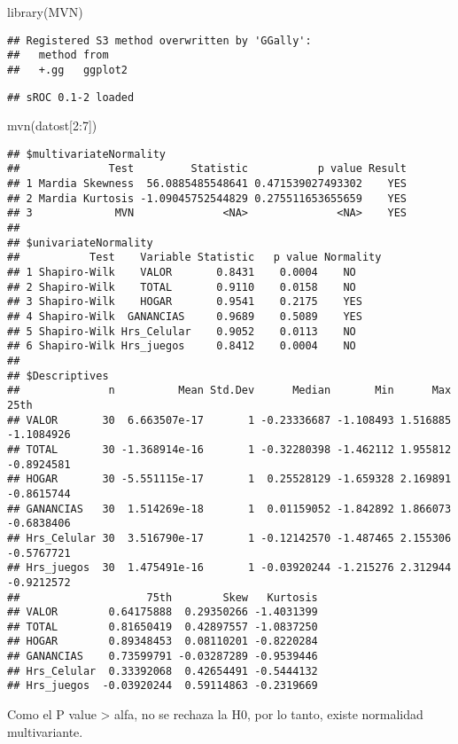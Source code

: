 \documentclass[
]{article}
\newenvironment{Shaded}{\begin{snugshade}}{\end{snugshade}}
\newcommand{\DecValTok}[1]{\textcolor[rgb]{0.00,0.00,0.81}{#1}}
\newcommand{\FunctionTok}[1]{\textcolor[rgb]{0.00,0.00,0.00}{#1}}
\newcommand{\NormalTok}[1]{#1}
\newcommand{\SpecialCharTok}[1]{\textcolor[rgb]{0.00,0.00,0.00}{#1}}
\begin{document}
\begin{Shaded}
\begin{Highlighting}[]
\FunctionTok{library}\NormalTok{(MVN)}
\end{Highlighting}
\end{Shaded}

\begin{verbatim}
## Registered S3 method overwritten by 'GGally':
##   method from   
##   +.gg   ggplot2
\end{verbatim}

\begin{verbatim}
## sROC 0.1-2 loaded
\end{verbatim}

\begin{Shaded}
\begin{Highlighting}[]
\FunctionTok{mvn}\NormalTok{(datost[}\DecValTok{2}\SpecialCharTok{:}\DecValTok{7}\NormalTok{])}
\end{Highlighting}
\end{Shaded}

\begin{verbatim}
## $multivariateNormality
##              Test         Statistic           p value Result
## 1 Mardia Skewness  56.0885485548641 0.471539027493302    YES
## 2 Mardia Kurtosis -1.09045752544829 0.275511653655659    YES
## 3             MVN              <NA>              <NA>    YES
## 
## $univariateNormality
##           Test    Variable Statistic   p value Normality
## 1 Shapiro-Wilk    VALOR       0.8431    0.0004    NO    
## 2 Shapiro-Wilk    TOTAL       0.9110    0.0158    NO    
## 3 Shapiro-Wilk    HOGAR       0.9541    0.2175    YES   
## 4 Shapiro-Wilk  GANANCIAS     0.9689    0.5089    YES   
## 5 Shapiro-Wilk Hrs_Celular    0.9052    0.0113    NO    
## 6 Shapiro-Wilk Hrs_juegos     0.8412    0.0004    NO    
## 
## $Descriptives
##              n          Mean Std.Dev      Median       Min      Max       25th
## VALOR       30  6.663507e-17       1 -0.23336687 -1.108493 1.516885 -1.1084926
## TOTAL       30 -1.368914e-16       1 -0.32280398 -1.462112 1.955812 -0.8924581
## HOGAR       30 -5.551115e-17       1  0.25528129 -1.659328 2.169891 -0.8615744
## GANANCIAS   30  1.514269e-18       1  0.01159052 -1.842892 1.866073 -0.6838406
## Hrs_Celular 30  3.516790e-17       1 -0.12142570 -1.487465 2.155306 -0.5767721
## Hrs_juegos  30  1.475491e-16       1 -0.03920244 -1.215276 2.312944 -0.9212572
##                    75th        Skew   Kurtosis
## VALOR        0.64175888  0.29350266 -1.4031399
## TOTAL        0.81650419  0.42897557 -1.0837250
## HOGAR        0.89348453  0.08110201 -0.8220284
## GANANCIAS    0.73599791 -0.03287289 -0.9539446
## Hrs_Celular  0.33392068  0.42654491 -0.5444132
## Hrs_juegos  -0.03920244  0.59114863 -0.2319669
\end{verbatim}

Como el P value \textgreater{} alfa, no se rechaza la H0, por lo tanto,
existe normalidad multivariante.
\end{document}
